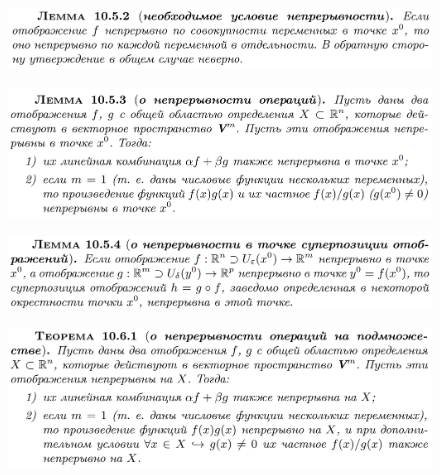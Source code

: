 \documentclass{article}
\begin{document}
\begin{figure}[h!]
    \centering
    \includegraphics[width=\textwidth]{26.png}
    \vspace{-1cm}
\end{figure}
\begin{figure}[h!]
    \centering
    \includegraphics[width=\textwidth]{27.png}
    \vspace{-1cm}
\end{figure}
\newpage
\begin{figure}[h!]
    \centering
    \includegraphics[width=\textwidth]{28.png}
    \vspace{-1cm}
\end{figure}
\begin{figure}[h!]
    \centering
    \vspace{-1cm}
\end{figure}
\begin{figure}[h!]
    \centering
    \includegraphics[width=\textwidth]{30.png}
    \vspace{-1cm}
\end{figure}
\end{document}

